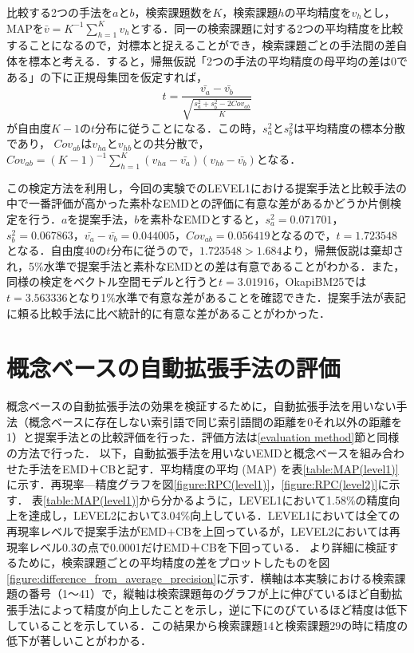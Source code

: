 \documentclass[japanese]{jnlp_1.4}
\begin{document}
比較する2つの手法を$a$と$b$，検索課題数を$K$，検索課題$h$の平均精度を$v_h$とし，MAPを$\bar{v}=K^{-1}\sum_{h=1}^K v_h$とする．同一の検索課題に対する2つの平均精度を比較することになるので，対標本と捉えることができ，検索課題ごとの手法間の差自体を標本と考える．すると，帰無仮説「2つの手法の平均精度の母平均の差は0である」の下に正規母集団を仮定すれば，
\begin{equation}
 t=\frac{\bar{v_a}-\bar{v_b}}{\sqrt{\frac{s_a^2+s_b^2-2Cov_{ab}}{K}}}
\end{equation}
が自由度$K-1$の$t$分布に従うことになる．この時，$s_a^2$と$s_b^2$は平均精度の標本分散であり，
$Cov_{ab}$は$v_{ha}$と$v_{hb}$との共分散で，$Cov_{ab}=(K-1)^{-1}\sum_{h=1}^{K}(v_{ha}-\bar{v_a})(v_{hb}-\bar{v_b})$となる．

この検定方法を利用し，今回の実験でのLEVEL1における提案手法と比較手法の中で一番評価が高かった素朴なEMDとの評価に有意な差があるかどうか片側検定を行う．$a$を提案手法，$b$を素朴なEMDとすると，$s_a^2=0.071701$，$s_b^2=0.067863$，$\bar{v_a}-\bar{v_b}=0.044005$，$Cov_{ab}=0.056419$となるので，$t=1.723548$となる．自由度40の$t$分布に従うので，$1.723548>1.684$より，帰無仮説は棄却され，5\%水準で提案手法と素朴なEMDとの差は有意であることがわかる．また，同様の検定をベクトル空間モデルと行うと$t=3.01916$，OkapiBM25では$t=3.563336$となり1\%水準で有意な差があることを確認できた．提案手法が表記に頼る比較手法に比べ統計的に有意な差があることがわかった．


\section{概念ベースの自動拡張手法の評価}

概念ベースの自動拡張手法の効果を検証するために，自動拡張手法を用いない手法（概念ベースに存在しない索引語で同じ索引語間の距離を0それ以外の距離を1）と提案手法との比較評価を行った．評価方法は\ref{evaluation method}節と同様の方法で行った．
以下，自動拡張手法を用いないEMDと概念ベースを組み合わせた手法をEMD＋CBと記す．平均精度の平均 (MAP) を表\ref{table:MAP(level1)}に示す．再現率—精度グラフを図\ref{figure:RPC(level1)}，\ref{figure:RPC(level2)}に示す．
表\ref{table:MAP(level1)}から分かるように，LEVEL1において1.58\%の精度向上を達成し，LEVEL2において3.04\%向上している．LEVEL1においては全ての再現率レベルで提案手法がEMD+CBを上回っているが，LEVEL2においては再現率レベル0.3の点で0.0001だけEMD＋CBを下回っている．
より詳細に検証するために，検索課題ごとの平均精度の差をプロットしたものを図\ref{figure:difference_from_average_precision}に示す．横軸は本実験における検索課題の番号（1〜41）で，縦軸は検索課題毎のグラフが上に伸びているほど自動拡張手法によって精度が向上したことを示し，逆に下にのびているほど精度は低下していることを示している．この結果から検索課題14と検索課題29の時に精度の低下が著しいことがわかる．
\end{document}
